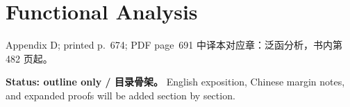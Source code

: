 \chapter{Functional Analysis}
\label{app:functional-analysis}

\PDESource
  {Appendix D; printed p.~674; PDF page~691}
  {中译本对应章：泛函分析，书内第 482 页起。}

\noindent\textbf{Status: outline only / 目录骨架。}
English exposition, Chinese margin notes, and expanded proofs will be added section by section.







